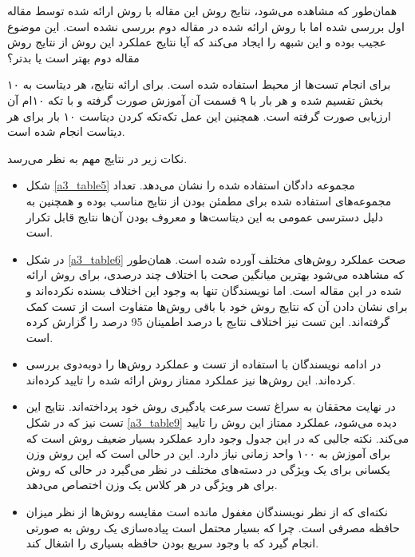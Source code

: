 \documentclass[12pt, a4paper]{article}
\begin{document}
همان‌طور که مشاهده می‌شود، نتایج روش این مقاله با روش ارائه شده توسط مقاله اول
بررسی شده اما با روش ارائه شده در مقاله دوم بررسی نشده است. این موضوع عجیب
بوده و این شبهه را ایجاد می‌کند که آیا نتایج عملکرد این روش از نتایج روش
مقاله دوم بهتر است یا بد‌تر؟

برای انجام تست‌ها از محیط  استفاده شده است. برای ارائه نتایج،
هر دیتاست به ۱۰ بخش تقسیم شده و هر بار با ۹ قسمت آن آموزش صورت گرفته
و با تکه ۱۰‌ام آن ارزیابی صورت گرفته است. همچنین این عمل تکه‌تکه کردن دیتاست
۱۰ بار برای هر دیتاست انجام شده است.

نکات زیر در نتایج مهم به نظر می‌رسد.

\begin{itemize}
    \item شکل \ref{a3_table5} مجموعه دادگان استفاده شده را نشان می‌دهد.
          تعداد مجموعه‌های استفاده شده برای مطمئن بودن از نتایج مناسب بوده و همچنین
          به دلیل دسترسی عمومی به این دیتاست‌ها و معروف بودن آن‌ها نتایج قابل تکرار است.
    \item در شکل \ref{a3_table6} صحت عملکرد روش‌های مختلف آورده شده است. همان‌طور
          که مشاهده می‌شود بهترین میانگین صحت با اختلاف چند درصدی، برای روش ارائه شده
          در این مقاله است. اما نویسندگان تنها به وجود این اختلاف بسنده نکرده‌اند
          و برای نشان ‌دادن آن که نتایج روش خود با باقی روش‌ها متفاوت است از تست
           کمک گرفته‌اند. این تست نیز اختلاف نتایج با درصد اطمینان 95 درصد
          را گزارش کرده است.
    \item در ادامه نویسندگان با استفاده از تست  و
           عملکرد روش‌ها را دوبه‌دوی بررسی کرده‌اند. این روش‌ها نیز
          عملکرد ممتاز روش ارائه شده را تایید کرده‌اند.
    \item در نهایت محققان به سراغ تست سرعت یادگیری روش خود پرداخته‌اند.
          نتایج این تست نیز که در شکل \ref{a3_table9} دیده می‌شود، عملکرد ممتاز
          این روش را تایید می‌کند. نکته جالبی که در این جدول وجود دارد عملکرد بسیار
          ضعیف روش  است که برای آموزش به ۱۰۰ واحد زمانی نیاز دارد.
          این در حالی است که این روش وزن یکسانی برای یک ویژگی‌ در دسته‌های مختلف
          در نظر می‌گیرد در حالی که روش  برای هر ویژگی در
          هر کلاس یک وزن اختصاص می‌دهد.
    \item نکته‌ای که از نظر نویسندگان مغفول مانده است مقایسه روش‌ها از نظر
          میزان حافظه مصرفی است. چرا که بسیار محتمل است پیاده‌سازی یک روش به صورتی انجام
          گیرد که با وجود سریع بودن حافظه بسیاری را اشغال کند.
\end{itemize}
\end{document}
